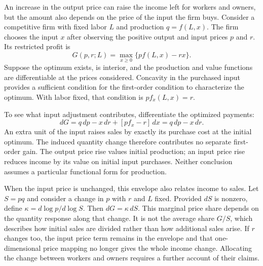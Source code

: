 An increase in the output price can raise the income left for workers and owners,
but the amount also depends on the price of the input the firm buys. Consider a
competitive firm with fixed labor $L$ and production $q=f(L,x)$. The firm chooses
the input $x$ after observing the positive output and input prices $p$ and $r$. Its
restricted profit is
\[
 G(p,r;L)=\max_{x\geq0}\{p f(L,x)-rx\}.
\]
Suppose the optimum exists, is interior, and the production and value functions
are differentiable at the prices considered. Concavity in the purchased input
provides a sufficient condition for the first-order condition to characterize
the optimum. With labor fixed, that condition is $p f_x(L,x)=r$.

To see what input adjustment contributes, differentiate the optimized payments:
\[
 dG=q\,dp-x\,dr+[p f_x-r]\,dx=q\,dp-x\,dr.
\]
An extra unit of the input raises sales by exactly its purchase cost at the
initial optimum. The induced quantity change therefore contributes no separate
first-order gain. The output price rise values initial production; an input
price rise reduces income by its value on initial input purchases. Neither
conclusion assumes a particular functional form for production.

When the input price is unchanged, this envelope also relates income to sales.
Let $S=pq$ and consider a change in $p$ with $r$ and $L$ fixed. Provided $dS$ is
nonzero, define $\kappa=d\log p/d\log S$. Then $dG=\kappa\,dS$. This marginal
price share depends on the quantity response along that change. It is not the
average share $G/S$, which describes how initial sales are divided rather than
how additional sales arise. If $r$ changes too, the input price term remains in
the envelope and that one-dimensional price mapping no longer gives the whole
income change. Allocating the change between workers and owners requires a
further account of their claims.
